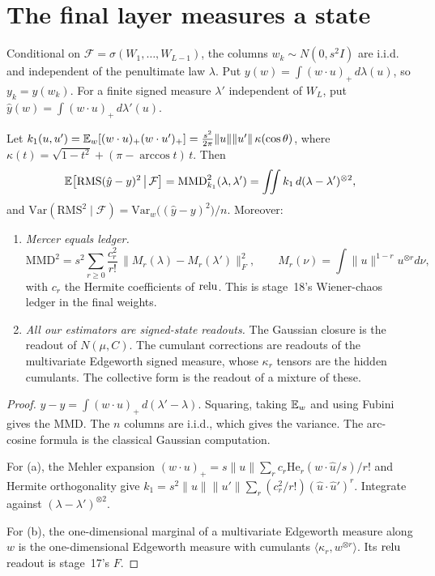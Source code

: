 \section{The final layer measures a state}
Conditional on $\mathcal F=\sigma(W_1,\dots,W_{L-1})$, the columns $w_k\sim N(0,s^2I)$ are i.i.d. and independent of the penultimate
law $\lambda$. Put $y(w)=\int(w\cdot u)_+\,d\lambda(u)$, so $y_k=y(w_k)$. For a finite signed measure $\lambda'$ independent of
$W_L$, put $\hat y(w)=\int(w\cdot u)_+\,d\lambda'(u)$.

\begin{theorem}\label{thm:mmd}
Let $k_1(u,u')=\mathbb{E}_w[(w\cdot u)_+(w\cdot u')_+]=\frac{s^2}{2\pi}\|u\|\|u'\|\,\kappa(\cos\theta)$, where
$\kappa(t)=\sqrt{1-t^2}+(\pi-\arccos t)\,t$. Then
\[
\mathbb{E}\big[\mathrm{RMS}(\hat y-y)^2\,\big|\,\mathcal F\big]=\mathrm{MMD}^2_{k_1}(\lambda,\lambda')=\iint k_1\,d(\lambda-\lambda')^{\otimes2},
\]
and $\mathrm{Var}(\mathrm{RMS}^2\mid\mathcal F)=\mathrm{Var}_w\big((\hat y-y)^2\big)/n$. Moreover:
\begin{enumerate}[label=(\alph*),leftmargin=1.6em,itemsep=1pt,topsep=1pt]
\item \emph{Mercer equals ledger.}
\[
\mathrm{MMD}^2=s^2\sum_{r\ge0}\frac{c_r^2}{r!}\,\big\|M_r(\lambda)-M_r(\lambda')\big\|_F^2,\qquad M_r(\nu)=\int\|u\|^{1-r}u^{\otimes r}d\nu ,
\]
with $c_r$ the Hermite coefficients of $\operatorname{relu}$. This is stage~18's Wiener-chaos ledger in the final weights.
\item \emph{All our estimators are signed-state readouts.} The Gaussian closure is the readout of $N(\mu,C)$.
The cumulant corrections are readouts of the multivariate Edgeworth signed measure, whose $\kappa_r$ tensors
are the hidden cumulants. The collective form is the readout of a mixture of these.
\end{enumerate}
\end{theorem}
\begin{proof}
$\hat y-y=\int(w\cdot u)_+\,d(\lambda'-\lambda)$. Squaring, taking $\mathbb{E}_w$ and using Fubini gives the MMD. The $n$ columns are
i.i.d., which gives the variance. The arc-cosine formula is the classical Gaussian computation.

For (a), the Mehler expansion $(w\cdot u)_+=s\|u\|\sum_rc_r\mathrm{He}_r(w\cdot\hat u/s)/r!$ and Hermite orthogonality give
$k_1=s^2\|u\|\|u'\|\sum_r(c_r^2/r!)(\hat u\cdot\hat u')^r$. Integrate against $(\lambda-\lambda')^{\otimes2}$.

For (b), the one-dimensional marginal of a multivariate Edgeworth measure along $w$ is the one-dimensional
Edgeworth measure with cumulants $\langle\kappa_r,w^{\otimes r}\rangle$. Its $\operatorname{relu}$ readout is stage~17's $F$.
\end{proof}

